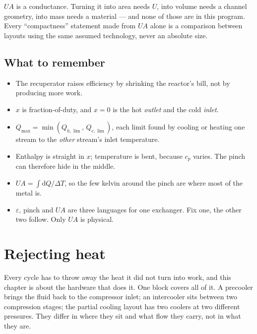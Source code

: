 \documentclass[11pt,a4paper]{report}
\begin{document}
\begin{caveat}[title={Caveat: a converged $UA$ is not a size}]
$UA$ is a conductance. Turning it into area needs $U$, into volume needs a
channel geometry, into mass needs a material --- and none of those are in
this program. Every ``compactness'' statement made from $UA$ alone is a
comparison between layouts using the same assumed technology, never an
absolute size.
\end{caveat}

\section{What to remember}

\begin{itemize}\itemsep2pt
\item The recuperator raises efficiency by shrinking the reactor's bill,
      not by producing more work.
\item $x$ is fraction-of-duty, and $x=0$ is the hot \emph{outlet} and the
      cold \emph{inlet}.
\item $Q_{\max} = \min(Q_{h,\lim},\, Q_{c,\lim})$, each limit found by
      cooling or heating one stream to the \emph{other} stream's inlet
      temperature.
\item Enthalpy is straight in $x$; temperature is bent, because $c_p$ varies.
      The pinch can therefore hide in the middle.
\item $UA = \int \mathrm{d}Q/\Delta T$, so the few kelvin around the pinch
      are where most of the metal is.
\item $\varepsilon$, pinch and $UA$ are three languages for one exchanger.
      Fix one, the other two follow. Only $UA$ is physical.
\end{itemize}

\chapter{Rejecting heat}
\label{ch:precooler}

Every cycle has to throw away the heat it did not turn into work, and this
chapter is about the hardware that does it. One block covers all of it. A
precooler brings the fluid back to the compressor inlet; an intercooler sits
between two compression stages; the partial cooling layout has two coolers
at two different pressures. They differ in where they sit and what flow they
carry, not in what they are.
\end{document}

